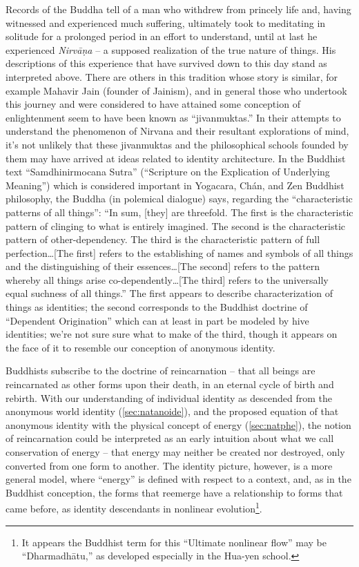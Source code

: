 \documentclass[pra,twocolumn,groupedaddress,10pt]{revtex4}
\theoremstyle{definition}
\begin{document}
Records of the Buddha tell of a man who withdrew from princely life and, having witnessed and experienced much suffering, ultimately took to meditating in solitude for a prolonged period in an effort to understand, until at last he experienced \textit{Nirv\={a}\d{n}a} -- a supposed realization of the true nature of things. His descriptions of this experience that have survived down to this day stand as interpreted above. There are others in this tradition whose story is similar, for example Mahavir Jain (founder of Jainism), and in general those who undertook this journey and were considered to have attained some conception of enlightenment seem to have been known as ``jivanmuktas.'' In their attempts to understand the phenomenon of Nirvana and their resultant explorations of mind, it's not unlikely that these jivanmuktas and the philosophical schools founded by them may have arrived at ideas related to identity architecture. In the Buddhist text ``Samdhinirmocana Sutra'' (``Scripture on the Explication of Underlying Meaning'') which is considered important in Yogacara, Ch\'{a}n, and Zen Buddhist philosophy, the Buddha (in polemical dialogue) says, regarding the ``characteristic patterns of all things'': ``In sum, [they] are threefold. The first is the characteristic pattern of clinging to what is entirely imagined. The second is the characteristic pattern of other-dependency. The third is the characteristic pattern of full perfection\ldots [The first] refers to the establishing of names and symbols of all things and the distinguishing of their essences\ldots[The second] refers to the pattern whereby all things arise co-dependently\ldots[The third] refers to the universally equal suchness of all things.''\cite{samdhinirmocana} The first appears to describe characterization of things as identities; the second corresponds to the Buddhist doctrine of ``Dependent Origination'' which can at least in part be modeled by hive identities; we're not sure sure what to make of the third, though it appears on the face of it to resemble our conception of anonymous identity.

Buddhists subscribe to the doctrine of reincarnation -- that all beings are reincarnated as other forms upon their death, in an eternal cycle of birth and rebirth. With our understanding of individual identity as descended from the anonymous world identity (\autoref{sec:natanoide}), and the proposed equation of that anonymous identity with the physical concept of energy (\autoref{sec:natphe}), the notion of reincarnation could be interpreted as an early intuition about what we call conservation of energy -- that energy may neither be created nor destroyed, only converted from one form to another. The identity picture, however, is a more general model, where ``energy'' is defined with respect to a context, and, as in the Buddhist conception, the forms that reemerge have a relationship to forms that came before, as identity descendants in nonlinear evolution\footnote{It appears the Buddhist term for this ``Ultimate nonlinear flow'' may be ``Dharmadh\={a}tu,'' as developed especially in the Hua-yen school\cite{dharmadhatu}.}.
\end{document}
